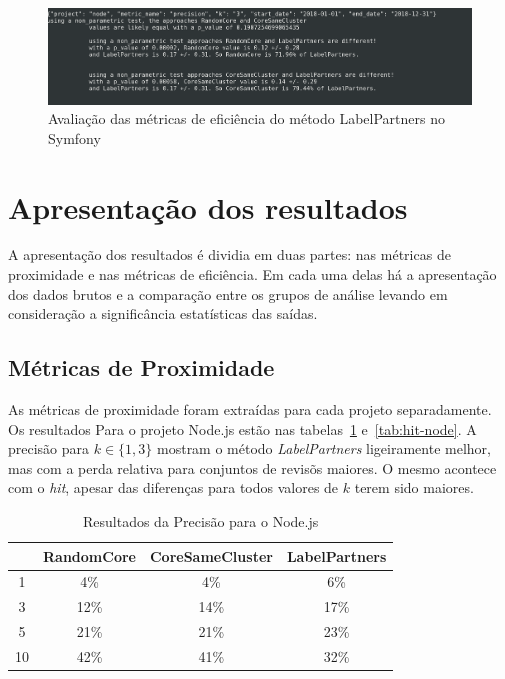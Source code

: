 \documentclass[12pt,openany,oneside,a4paper,english,brazil]{abntbibufjf}
\begin{document}
  \begin{figure}[!htbp]
      \centering
      \includegraphics[width=\textwidth]{metric-evaluation}
      \caption{Avaliação das métricas de eficiência do método LabelPartners no Symfony}\label{fig:metric-evaluation}
  \end{figure}

  \section{Apresentação dos resultados}\label{sec:apresentacao}
  A apresentação dos resultados é dividia em duas partes: nas métricas de proximidade e nas métricas de eficiência. Em cada uma delas há a apresentação dos dados brutos e a comparação entre os grupos de análise levando em consideração a significância estatísticas das saídas.

  \subsection{Métricas de Proximidade}

  As métricas de proximidade foram extraídas para cada projeto separadamente. Os resultados Para o projeto Node.js estão nas tabelas~\ref{tab:precision-node} e~\ref{tab:hit-node}. A precisão para $k \in \{1, 3\}$ mostram o método \textit{LabelPartners} ligeiramente melhor, mas com a perda relativa para conjuntos de revisõs maiores. O mesmo acontece com o \textit{hit}, apesar das diferenças para todos valores de $k$ terem sido maiores.

  \begin{table}[htbp]
  \caption{Resultados da Precisão para o Node.js}
  \begin{center}
  \begin{tabular}{|c|c|c|c|}
  \hline
  \textbf{} & \textbf{RandomCore} & \textbf{CoreSameCluster}& \textbf{LabelPartners} \\
  \hline
    1  & 4\%     & 4\%          & 6\%        \\
    3  & 12\%    & 14\%         & 17\%       \\
    5  & 21\%    & 21\%         & 23\%       \\
    10 & 42\%    & 41\%         & 32\%       \\
  \hline
  \end{tabular}
  \label{tab:precision-node}
  \end{center}
  \end{table}
\end{document}
